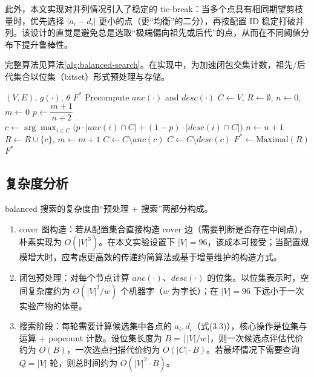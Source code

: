 \documentclass[UTF8,a4paper,12pt,twoside]{ctexart}  %
\begin{document}
此外，本文实现对并列情况引入了稳定的
tie-break：当多个点具有相同期望剪枝量时，优先选择 \(|a_i-d_i|\)
更小的点（更``均衡''的二分），再按配置 ID
稳定打破并列。该设计的直觉是避免总是选取``极端偏向祖先或后代''的点，从而在不同阈值分布下提升鲁棒性。

完整算法见算法\ref{alg:balanced-search}。在实现中，为加速闭包交集计数，祖先/后代集合以位集（bitset）形式预处理与存储。


\begin{algorithm}[htbp]
  \caption{Balanced Search on Poset}
  \label{alg:balanced-search}
  \begin{algorithmic}[1]
    \Require $(V,E)$, $g(\cdot)$, $\theta$
    \Ensure $F^*$
    \State Precompute $anc(\cdot)$ and $desc(\cdot)$
    \State $C \gets V$, $R \gets \emptyset$, $n \gets 0$, $m \gets 0$
    \State $p \gets \dfrac{m+1}{n+2}$
    \State $c \gets \arg\max_{i\in C}\big(p\cdot |anc(i)\cap C| + (1-p)\cdot |desc(i)\cap C|\big)$
    \State $n \gets n+1$
    \State $R \gets R \cup \{c\}$, $m \gets m+1$
    \State $C \gets C \setminus anc(c)$
    \Else
    \State $C \gets C \setminus desc(c)$
    \EndIf
    \EndWhile
    \State $F^* \gets \text{Maximal}(R)$
    \State \Return $F^*$
  \end{algorithmic}
\end{algorithm}


\subsection{复杂度分析}

balanced 搜索的复杂度由``预处理 + 搜索''两部分构成。

\begin{enumerate}
  \def\labelenumi{\arabic{enumi}.}
  \item
        cover 图构造：若从配置集合直接构造 cover
        边（需要判断是否存在中间点），朴素实现为
        \(O(|V|^3)\)。在本文实验设置下
        \(|V|=96\)，该成本可接受；当配置规模增大时，应考虑更高效的传递约简算法或基于增量维护的构造方式。
  \item
        闭包预处理：对每个节点计算 \(anc(\cdot)\)、\(desc(\cdot)\)
        的位集。以位集表示时，空间复杂度约为 \(O(|V|^2/w)\) 个机器字（\(w\)
        为字长）；在 \(|V|=96\) 下远小于一次实验产物的体量。
  \item
        搜索阶段：每轮需要计算候选集中各点的
        \(a_i,d_i\)（式(3.3)），核心操作是位集与运算 + popcount
        计数。设位集长度为 \(B=\lceil |V|/w \rceil\)，则一次候选点评估代价约为
        \(O(B)\)，一次选点扫描代价约为 \(O(|C|\cdot B)\)。若最坏情况下需要查询
        \(Q=|V|\) 轮，则总时间约为 \(O(|V|^2\cdot B)\)。
\end{enumerate}
\end{document}
